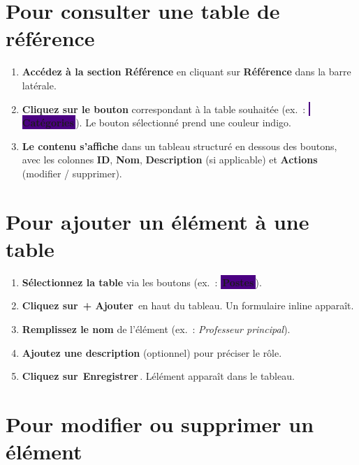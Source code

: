 \documentclass[12pt,a4paper]{report}
\newcommand{\bouton}[1]{{\colorbox{emerald}{\small\sffamily\bfseries\color{white}\,#1\,}}}
\newcommand{\onglet}[1]{{\colorbox{indigo}{\small\sffamily\bfseries\color{white}\,#1\,}}}
\begin{document}
\section{Pour consulter une table de r\'ef\'erence}

\begin{etape}[title=Proc\'edure : Consulter une table]
\begin{enumerate}[leftmargin=1.5cm,label=\textbf{\arabic*.},itemsep=8pt]
  \item \textbf{Acc\'edez \`a la section R\'ef\'erence} en cliquant sur \textbf{R\'ef\'erence} dans la barre lat\'erale.
  \item \textbf{Cliquez sur le bouton} correspondant \`a la table souhait\'ee (ex.\ : \onglet{Cat\'egories}). Le bouton s\'electionn\'e prend une couleur indigo.
  \item \textbf{Le contenu s'affiche} dans un tableau structur\'e en dessous des boutons, avec les colonnes \textbf{ID}, \textbf{Nom}, \textbf{Description} (si applicable) et \textbf{Actions} (modifier / supprimer).
\end{enumerate}
\end{etape}

\section{Pour ajouter un \'el\'ement \`a une table}

\begin{etape}[title=Proc\'edure : Ajouter un \'el\'ement]
\begin{enumerate}[leftmargin=1.5cm,label=\textbf{\arabic*.},itemsep=10pt]
  \item \textbf{S\'electionnez la table} via les boutons (ex.\ : \onglet{Postes}).
  \item \textbf{Cliquez sur} \bouton{+ Ajouter} en haut du tableau. Un formulaire inline appara\^it.
  \item \textbf{Remplissez le nom} de l'\'el\'ement (ex.\ : \textit{Professeur principal}).
  \item \textbf{Ajoutez une description} (optionnel) pour pr\'eciser le r\^ole.
  \item \textbf{Cliquez sur} \bouton{Enregistrer}. L\'el\'ement appara\^it dans le tableau.
\end{enumerate}
\end{etape}

\section{Pour modifier ou supprimer un \'el\'ement}
\end{document}
